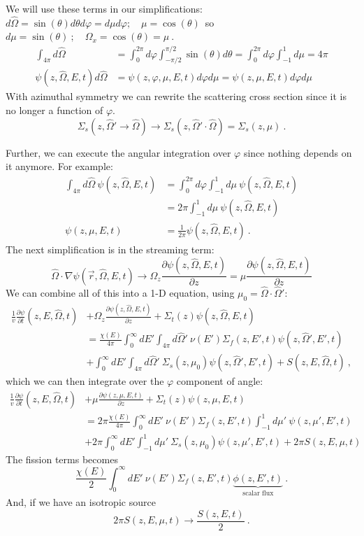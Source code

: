 \documentclass[12pt]{article}
\newcommand{\omvec}{\ensuremath{\hat{\Omega}}}
\newcommand{\vOmega}{\ensuremath{\hat{\Omega}}}
\begin{document}
We will use these terms in our simplifications:\\
$d\vOmega = \sin(\theta) d\theta d\varphi = d\mu d\varphi; \quad \mu = \cos(\theta)\,$ so $d\mu = \sin(\theta)\:; \quad \Omega_x = \cos(\theta) = \mu\:.$
\begin{align*}
\int_{4 \pi} d\vOmega &= \int_0^{2\pi} d\varphi \int_{-\pi/2}^{\pi/2} \sin(\theta) d\theta =  \int_0^{2\pi} d\varphi \int_{-1}^1 d\mu = 4\pi \\
\psi(z,\vOmega,E,t) d\vOmega &= \psi(z,\varphi, \mu,E,t) d\varphi  d\mu =  \psi(z, \mu,E,t) d\varphi  d\mu 
\end{align*}
%
With azimuthal symmetry we can rewrite the scattering cross section since it is no longer a function of $\varphi$.
\[\Sigma_s(z, \vOmega' \rightarrow \vOmega) \rightarrow \Sigma_s(z, \vOmega' \cdot \vOmega) = \Sigma_s(z, \mu) \:.\]

Further, we can execute the angular integration over $\varphi$ since nothing depends on it anymore. For example:
\begin{align*}
\int_{4 \pi} d\vOmega\: \psi(z, \vOmega, E, t) &=   \int_0^{2\pi} d\varphi \int_{-1}^1 d\mu \:\psi(z, \vOmega, E, t) \\
&= 2 \pi \int_{-1}^1 d\mu \:\psi(z, \vOmega, E, t)\\
\psi(z, \mu, E, t) &= \frac{1}{2 \pi}\psi(z, \vOmega, E, t)\:.
\end{align*}
%
The next simplification is in the streaming term:
\[\vOmega \cdot \nabla \psi(\vec{r}, \vOmega, E, t) \rightarrow \Omega_z \frac{\partial \psi(z, \vOmega, E, t)}{\partial z} = \mu \frac{\partial \psi(z, \vOmega, E, t)}{\partial z} \]
%
We can combine all of this into a 1-D equation, using $\mu_0 = \vOmega \cdot \vOmega'$:
\begin{align*}
\frac{1}{v}\frac{\partial \psi}{\partial t}(z,E,\omvec,t) &+ \Omega_z \frac{\partial \psi(z, \vOmega, E, t)}{\partial z} + \Sigma_t(z)\psi(z, \vOmega, E, t)  \\
&= \frac{\chi(E)}{4 \pi} \int_0^{\infty} dE'\int_{4 \pi} d\vOmega'\:  \nu(E')\Sigma_f(z,E',t)\psi(z, \vOmega', E', t)  \\
&+ \int_0^{\infty} dE' \int_{4 \pi} d\vOmega'\: \Sigma_s(z, \mu_0)\psi(z, \vOmega', E', t) + S(z, E, \vOmega, t)\:,
\end{align*}
%
which we can then integrate over the $\varphi$ component of angle:
\begin{align*}
\frac{1}{v}\frac{\partial \psi}{\partial t}(z,E,\omvec,t) &+ \mu \frac{\partial \psi(z, \mu, E, t)}{\partial z} + \Sigma_t(z)\psi(z, \mu, E, t) \\
&= 2\pi\frac{\chi(E)}{4 \pi} \int_0^{\infty} dE' \: \nu(E')\Sigma_f(z,E',t) \int_{-1}^1 d\mu'\: \psi(z, \mu', E', t) \\
&+ 2\pi\int_0^{\infty} dE' \int_{-1}^1 d\mu'\: \Sigma_s(z, \mu_0)\psi(z, \mu', E', t)  + 2\pi S(z, E, \mu, t)
\end{align*}
%
The fission terms becomes
\[\frac{\chi(E)}{2} \int_0^{\infty} dE'\:  \nu(E')\Sigma_f(z,E',t)\underbrace{\phi(z, E', t)}_{\text{scalar flux}}\:. \]
And, if we have an isotropic source
\[2\pi S(z, E, \mu, t) \rightarrow \frac{S(z, E, t)}{2}\:. \]
\end{document}
